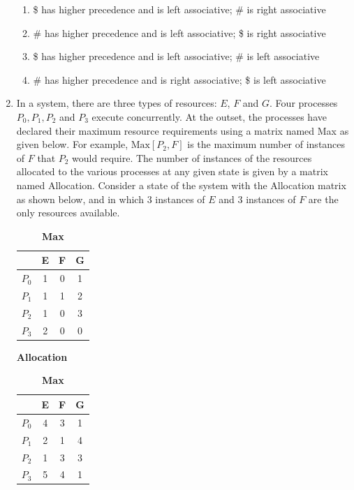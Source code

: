 \documentclass[journal,12pt,onecolumn]{IEEEtran}
\theoremstyle{remark}
\begin{document}
\begin{enumerate}
\begin{enumerate}
	\item \$ has higher precedence and is left associative; \# is right associative
	\item \# has higher precedence and is left associative; \$ is right associative
	\item \$ has higher precedence and is left associative; \# is left associative
	\item \# has higher precedence and is right associative; \$ is left associative
\end{enumerate}
    \item In a system, there are three types of resources: $E$, $F$ and $G$. Four processes $P_0, P_1, P_2$ and $P_3$ execute concurrently. At the outset, the processes have declared their maximum resource requirements using a matrix named Max as given below. For example, $\text{Max}[P_2, F]$ is the maximum number of instances of $F$ that $P_2$ would require. The number of instances of the resources allocated to the various processes at any given state is given by a matrix named Allocation.
\newline
Consider a state of the system with the Allocation matrix as shown below, and in which $3$ instances of $E$ and $3$ instances of $F$ are the only resources available.

\begin{table}[h]
	\centering
	\begin{minipage}{.5\linewidth}
		\centering
		
		\begin{tabular}{|c|c|c|c|}
			\hline
			& \textbf{E} & \textbf{F} & \textbf{G} \\ \hline
			$P_0$ & 1 & 0 & 1 \\ \hline
			$P_1$ & 1 & 1 & 2 \\ \hline
			$P_2$ & 1 & 0 & 3 \\ \hline
			$P_3$ & 2 & 0 & 0 \\ \hline
		\end{tabular}
		\caption*{\textbf{Allocation}}
		\label{tab:q39_alloc}
	\end{minipage}%
	\begin{minipage}{.5\linewidth}
		\centering
		
		\begin{tabular}{|c|c|c|c|}
			\hline
			& \textbf{E} & \textbf{F} & \textbf{G} \\ \hline
			$P_0$ & 4 & 3 & 1 \\ \hline
			$P_1$ & 2 & 1 & 4 \\ \hline
			$P_2$ & 1 & 3 & 3 \\ \hline
			$P_3$ & 5 & 4 & 1 \\ \hline
		\end{tabular}
		\caption*{\textbf{Max}}
		\label{tab:q39_max}
	\end{minipage}
\end{table}


\end{enumerate}
\end{document}

